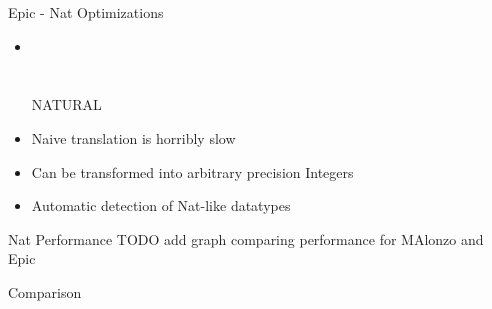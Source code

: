 \begin{frame}[fragile]{Epic - Nat Optimizations}
\begin{itemize}
\item \begin{code}%
\>  \AgdaSymbol{:}  \<%
\\
\>[0]\<[2]%
\>[2] \AgdaSymbol{:} \<%
\\
\>[0]\<[2]%
\>[2] \AgdaSymbol{:}  \AgdaSymbol{->} \<%
\\
\>\AgdaSymbol{\{-\#}  NATURAL  \AgdaSymbol{\#-\}}\<%
\\
\>\<%
\end{code}
\item Naive translation is horribly slow
\item Can be transformed into arbitrary precision Integers
\item Automatic detection of Nat-like datatypes
\end{itemize}
\end{frame}

\begin{frame}{Nat Performance}
TODO add graph comparing performance for MAlonzo and Epic
\end{frame}


\begin{frame}{Comparison}
\end{frame}
